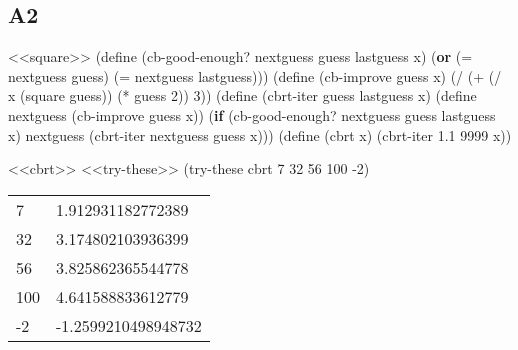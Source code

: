\documentclass[
]{article}
\newenvironment{Shaded}{}{}
\newcommand{\DecValTok}[1]{\textcolor[rgb]{0.25,0.63,0.44}{#1}}
\newcommand{\ExtensionTok}[1]{#1}
\newcommand{\FloatTok}[1]{\textcolor[rgb]{0.25,0.63,0.44}{#1}}
\newcommand{\FunctionTok}[1]{\textcolor[rgb]{0.02,0.16,0.49}{#1}}
\newcommand{\KeywordTok}[1]{\textcolor[rgb]{0.00,0.44,0.13}{\textbf{#1}}}
\newcommand{\NormalTok}[1]{#1}
\newcommand{\OperatorTok}[1]{\textcolor[rgb]{0.40,0.40,0.40}{#1}}
\begin{document}
\hypertarget{a2}{%
\subsection{A2}\label{a2}}

\hypertarget{cbrt}{%
\label{cbrt}}%
\begin{Shaded}
\begin{Highlighting}[numbers=left,,]
\NormalTok{\textless{}\textless{}square\textgreater{}\textgreater{}}
\NormalTok{(}\ExtensionTok{define}\FunctionTok{ }\NormalTok{(cb{-}good{-}enough? nextguess guess lastguess x)}
\NormalTok{  (}\KeywordTok{or}\NormalTok{ (}\OperatorTok{=}\NormalTok{ nextguess guess)}
\NormalTok{      (}\OperatorTok{=}\NormalTok{ nextguess lastguess)))}
\NormalTok{(}\ExtensionTok{define}\FunctionTok{ }\NormalTok{(cb{-}improve guess x)}
\NormalTok{  (}\OperatorTok{/}
\NormalTok{   (}\OperatorTok{+}
\NormalTok{    (}\OperatorTok{/}\NormalTok{ x (square guess))}
\NormalTok{    (}\OperatorTok{*}\NormalTok{ guess }\DecValTok{2}\NormalTok{))}
   \DecValTok{3}\NormalTok{))}
\NormalTok{(}\ExtensionTok{define}\FunctionTok{ }\NormalTok{(cbrt{-}iter guess lastguess x)}
\NormalTok{  (}\ExtensionTok{define}\FunctionTok{ nextguess }\NormalTok{(cb{-}improve guess x))}
\NormalTok{  (}\KeywordTok{if}\NormalTok{ (cb{-}good{-}enough? nextguess guess lastguess x)}
\NormalTok{      nextguess}
\NormalTok{      (cbrt{-}iter nextguess guess x)))}
\NormalTok{(}\ExtensionTok{define}\FunctionTok{ }\NormalTok{(cbrt x)}
\NormalTok{  (cbrt{-}iter }\FloatTok{1.1} \DecValTok{9999}\NormalTok{ x))}
\end{Highlighting}
\end{Shaded}

\begin{Shaded}
\begin{Highlighting}[numbers=left,,]
\NormalTok{\textless{}\textless{}cbrt\textgreater{}\textgreater{}}
\NormalTok{\textless{}\textless{}try{-}these\textgreater{}\textgreater{}}
\NormalTok{(try{-}these cbrt }\DecValTok{7} \DecValTok{32} \DecValTok{56} \DecValTok{100}\NormalTok{ {-}}\DecValTok{2}\NormalTok{)}
\end{Highlighting}
\end{Shaded}

\begin{longtable}[]{@{}ll@{}}
\toprule
\endhead
7 & 1.912931182772389 \\
32 & 3.174802103936399 \\
56 & 3.825862365544778 \\
100 & 4.641588833612779 \\
-2 & -1.2599210498948732 \\
\bottomrule
\end{longtable}
\end{document}
